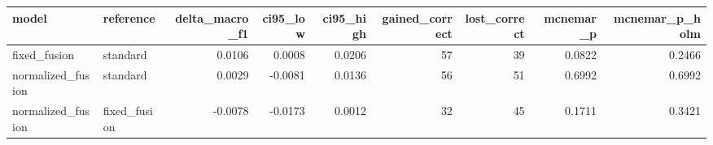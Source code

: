 \begin{tabular}{llrrrrrrr}
\toprule
model & reference & delta_macro_f1 & ci95_low & ci95_high & gained_correct & lost_correct & mcnemar_p & mcnemar_p_holm \\
\midrule
fixed_fusion & standard & 0.0106 & 0.0008 & 0.0206 & 57 & 39 & 0.0822 & 0.2466 \\
normalized_fusion & standard & 0.0029 & -0.0081 & 0.0136 & 56 & 51 & 0.6992 & 0.6992 \\
normalized_fusion & fixed_fusion & -0.0078 & -0.0173 & 0.0012 & 32 & 45 & 0.1711 & 0.3421 \\
\bottomrule
\end{tabular}
